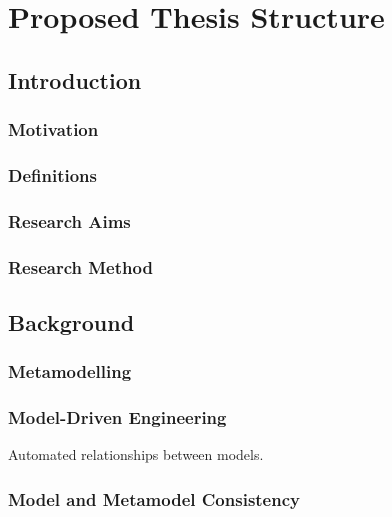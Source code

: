 

\section{Proposed Thesis Structure}

\subsection{Introduction}
\subsubsection{Motivation}
\subsubsection{Definitions}
\subsubsection{Research Aims}
\subsubsection{Research Method}

\subsection{Background}
\subsubsection{Metamodelling}

\subsubsection{Model-Driven Engineering}
Automated relationships between models.

\subsubsection{Model and Metamodel Consistency}

